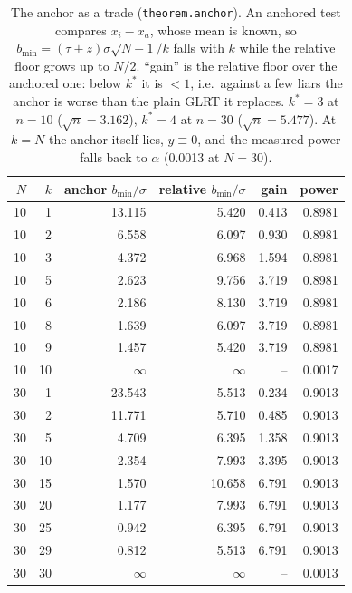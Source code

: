 \begin{table}[t]
\centering
\caption{The anchor as a trade (\texttt{theorem.anchor}). An anchored test compares $x_i-x_a$, whose mean is known, so $b_{\min}=(\tau+z)\sigma\sqrt{N-1}/k$ falls with $k$ while the relative floor grows up to $N/2$. ``gain'' is the relative floor over the anchored one: below $k^\ast$ it is $<1$, i.e.\ against a few liars the anchor is worse than the plain GLRT it replaces. $k^\ast=3$ at $n=10$ ($\sqrt{n}=3.162$), $k^\ast=4$ at $n=30$ ($\sqrt{n}=5.477$). At $k=N$ the anchor itself lies, $y\equiv0$, and the measured power falls back to $\alpha$ (0.0013 at $N=30$).}
\label{tab:anchor}
\small
\setlength{\tabcolsep}{4pt}
\begin{tabular}{@{}r r r r r r@{}}
\toprule
$N$ & $k$ & anchor $b_{\min}/\sigma$ & relative $b_{\min}/\sigma$ & gain & power \\
\midrule
10 & 1 & 13.115 & 5.420 & 0.413 & 0.8981 \\
10 & 2 & 6.558 & 6.097 & 0.930 & 0.8981 \\
10 & 3 & 4.372 & 6.968 & 1.594 & 0.8981 \\
10 & 5 & 2.623 & 9.756 & 3.719 & 0.8981 \\
10 & 6 & 2.186 & 8.130 & 3.719 & 0.8981 \\
10 & 8 & 1.639 & 6.097 & 3.719 & 0.8981 \\
10 & 9 & 1.457 & 5.420 & 3.719 & 0.8981 \\
10 & 10 & $\infty$ & $\infty$ & -- & 0.0017 \\
30 & 1 & 23.543 & 5.513 & 0.234 & 0.9013 \\
30 & 2 & 11.771 & 5.710 & 0.485 & 0.9013 \\
30 & 5 & 4.709 & 6.395 & 1.358 & 0.9013 \\
30 & 10 & 2.354 & 7.993 & 3.395 & 0.9013 \\
30 & 15 & 1.570 & 10.658 & 6.791 & 0.9013 \\
30 & 20 & 1.177 & 7.993 & 6.791 & 0.9013 \\
30 & 25 & 0.942 & 6.395 & 6.791 & 0.9013 \\
30 & 29 & 0.812 & 5.513 & 6.791 & 0.9013 \\
30 & 30 & $\infty$ & $\infty$ & -- & 0.0013 \\
\bottomrule
\end{tabular}
\end{table}
